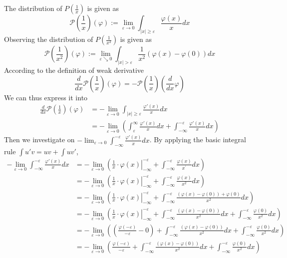 \documentclass{article}
\begin{document}
\section{}
The distribution of $P(\frac{1}{x})$ is given as 
\[
	\mathcal{P}\left(\frac{1}{x}\right)(\varphi) :=\lim _{\varepsilon \rightarrow 0} \int_{|x| \geq \varepsilon} \frac{\varphi(x)}{x} d x
\]
Observing the distribution of $P(\frac{1}{x^2})$ is given as 
\[
	\mathcal{P}\left(\frac{1}{x^{2}}\right)(\varphi) :=\lim _{\varepsilon \searrow 0} \int_{|x|>\varepsilon} \frac{1}{x^{2}}(\varphi(x)-\varphi(0)) d x
\]
According to the definition of weak derivative
\[
	\frac{d}{dx}\mathcal{P}\left(\frac{1}{x}\right)(\varphi) = - \mathcal{P}\left(\frac{1}{x}\right)(\frac{d}{dx}\varphi) 
\]	
We can thus express it into
\begin{align*}
	\frac{d}{dx}\mathcal{P}\left(\frac{1}{x}\right)(\varphi)& = - \lim _{\varepsilon \rightarrow 0} \int_{|x| \geq \varepsilon} \frac{\varphi'(x)}{x} d x \\
	&= -\lim _{\varepsilon \rightarrow 0} (\int_{\varepsilon}^\infty \frac{\varphi'(x)}{x} d x + \int_{-\infty}^{-\varepsilon} \frac{\varphi'(x)}{x} d x)
\end{align*}
Then we investigate on $\displaystyle -\lim _{\varepsilon \rightarrow 0} \int_{-\infty}^{-\varepsilon} \frac{\varphi'(x)}{x} d x$. By applying the basic integral rule $\int u'v = uv + \int uv'$, 
\begin{align*}
	-\lim _{\varepsilon \rightarrow 0} \int_{-\infty}^{-\varepsilon} \frac{\varphi'(x)}{x} d x & = -\lim _{\varepsilon \rightarrow 0}\left(\left.\frac{1}{x}\cdot \varphi(x) \right|_{-\infty}^ {-\varepsilon} + \int_{-\infty}^{-\varepsilon} \frac{\varphi(x)}{x^\prime} d x\right )\\
	&=-\lim _{\varepsilon \rightarrow 0}\left(\left.\frac{1}{x}\cdot \varphi(x) \right|_{-\infty}^ {-\varepsilon} + \int_{-\infty}^{-\varepsilon} \frac{\varphi(x)}{x^2} d x\right ) \\
	&=-\lim _{\varepsilon \rightarrow 0}\left(\left.\frac{1}{x}\cdot \varphi(x) \right|_{-\infty}^ {-\varepsilon} + \int_{-\infty}^{-\varepsilon} \frac{(\varphi(x)-\varphi(0))+ \varphi(0)}{x^2} d x\right )\\
	&=-\lim _{\varepsilon \rightarrow 0}\left(\left.\frac{1}{x}\cdot \varphi(x) \right|_{-\infty}^ {-\varepsilon} + \int_{-\infty}^{-\varepsilon} \frac{(\varphi(x)-\varphi(0))}{x^2} d x+ \int_{-\infty}^{-\varepsilon} \frac{\varphi(0)}{x^2} d x\right )\\
	&=-\lim _{\varepsilon \rightarrow 0}\left( (\frac{\varphi(-\varepsilon)}{-\varepsilon} - 0) + \int_{-\infty}^{-\varepsilon} \frac{(\varphi(x)-\varphi(0))}{x^2} d x+ \int_{-\infty}^{-\varepsilon} \frac{\varphi(0)}{x^2} d x\right )\\
	&=-\lim _{\varepsilon \rightarrow 0}\left( \frac{\varphi(-\varepsilon)}{-\varepsilon} + \int_{-\infty}^{-\varepsilon} \frac{(\varphi(x)-\varphi(0))}{x^2} d x+ \int_{-\infty}^{-\varepsilon} \frac{\varphi(0)}{x^2} d x\right )
\end{align*}
\end{document}
